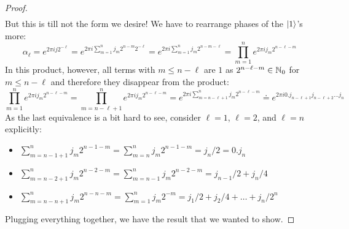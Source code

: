\begin{proof}
\begin{align}
				\end{align}
				But this is till not the form we desire! We have to rearrange phases of the \(\ket{1}\)'s more:
				\begin{equation}
					\alpha_\ell
					= e^{2 \pi i j 2^{-\ell}}
					= e^{2 \pi i \sum_{m = 1}^{n} j_m 2^{n - m} 2^{-\ell}}
					= e^{2 \pi i \sum_{m = 1}^{n} j_m 2^{n - m - \ell}}
					= \prod_{m = 1}^{n} e^{2 \pi i j_m 2^{n - \ell - m}}
				\end{equation}
				In this product, however, all terms with \( m \leq n - \ell \) are \(1\) as \( 2^{n - \ell - m} \in \mathbb{N}_0 \) for \( m \leq n - \ell \) and therefore they disappear from the product:
				\begin{equation}
					\prod_{m = 1}^{n} e^{2 \pi i j_m 2^{n - \ell - m}}
					= \prod_{m = n - \ell + 1}^{n} e^{2 \pi i j_m 2^{n - \ell - m}}
					= e^{2 \pi i \sum_{m = n - \ell + 1}^{n} j_m 2^{n - \ell - m}}
					\doteq e^{2 \pi i 0.j_{n - \ell + 1} j_{n - \ell + 2} \dots j_{n}}
				\end{equation}
				As the last equivalence is a bit hard to see, consider \(\ell = 1\), \(\ell = 2\), and \(\ell = n\) explicitly:
				\begin{itemize}
					\item \( \sum_{m = n - 1 + 1}^{n} j_m 2^{n - 1 - m} = \sum_{m = n}^{n} j_m 2^{n - 1 - m} = j_n / 2 = 0.j_n \)
					\item \( \sum_{m = n - 2 + 1}^{n} j_m 2^{n - 2 - m} = \sum_{m = n - 1}^{n} j_m 2^{n - 2 - m} = j_{n - 1} / 2 + j_n / 4 \)
					\item \( \sum_{m = n - n + 1}^{n} j_m 2^{n - n - m} = \sum_{m = 1}^{n} j_m 2^{-m} = j_1 / 2 + j_2 / 4 + \dots + j_n / 2^n \)
				\end{itemize}
				Plugging everything together, we have the result that we wanted to show.
			\end{proof}

